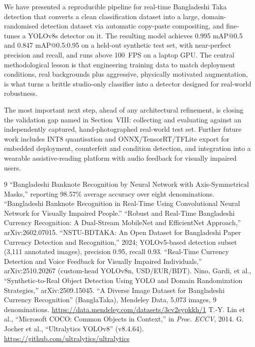 \documentclass[10pt,twocolumn]{article}
\begin{document}
We have presented a reproducible pipeline for real-time Bangladeshi Taka detection that converts a clean classification dataset into a large, domain-randomised detection dataset via automatic copy-paste compositing, and fine-tunes a YOLOv8s detector on it. The resulting model achieves 0.995 mAP@0.5 and 0.847 mAP@0.5:0.95 on a held-out synthetic test set, with near-perfect precision and recall, and runs above 100~FPS on a laptop GPU. The central methodological lesson is that engineering training data to match deployment conditions, real backgrounds plus aggressive, physically motivated augmentation, is what turns a brittle studio-only classifier into a detector designed for real-world robustness.

The most important next step, ahead of any architectural refinement, is closing the validation gap named in Section~VIII: collecting and evaluating against an independently captured, hand-photographed real-world test set. Further future work includes INT8 quantisation and ONNX/TensorRT/TFLite export for embedded deployment, counterfeit and condition detection, and integration into a wearable assistive-reading platform with audio feedback for visually impaired users.

\begin{thebibliography}{9}
\footnotesize
{} ``Bangladeshi Banknote Recognition by Neural Network with Axis-Symmetrical Masks,'' reporting 98.57\% average accuracy over eight denominations.
 ``Bangladeshi Banknote Recognition in Real-Time Using Convolutional Neural Network for Visually Impaired People.''
 ``Robust and Real-Time Bangladeshi Currency Recognition: A Dual-Stream MobileNet and EfficientNet Approach,'' arXiv:2602.07015.
 ``NSTU-BDTAKA: An Open Dataset for Bangladeshi Paper Currency Detection and Recognition,'' 2024; YOLOv5-based detection subset (3,111 annotated images), precision 0.95, recall 0.93.
 ``Real-Time Currency Detection and Voice Feedback for Visually Impaired Individuals,'' arXiv:2510.20267 (custom-head YOLOv8n, USD/EUR/BDT).
 Nino, Gardi, et al., ``Synthetic-to-Real Object Detection Using YOLO and Domain Randomization Strategies,'' arXiv:2509.15045.
 ``A Diverse Image Dataset for Bangladeshi Currency Recognition'' (BanglaTaka), Mendeley Data, 5,073 images, 9 denominations. \url{https://data.mendeley.com/datasets/3cv2sypkkh/1}
 T.-Y. Lin et al., ``Microsoft COCO: Common Objects in Context,'' in \emph{Proc. ECCV}, 2014.
 G. Jocher et al., ``Ultralytics YOLOv8'' (v8.4.64). \url{https://github.com/ultralytics/ultralytics}
\end{thebibliography}
\end{document}
